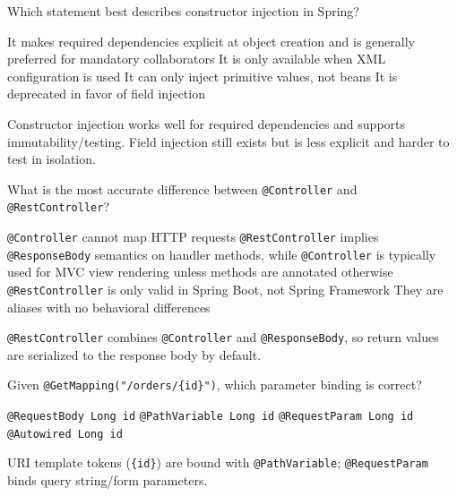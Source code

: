 
\question[4]
Which statement best describes constructor injection in Spring?
\begin{choices}
  \CorrectChoice It makes required dependencies explicit at object creation and is generally preferred for mandatory collaborators
  \choice It is only available when XML configuration is used
  \choice It can only inject primitive values, not beans
  \choice It is deprecated in favor of field injection
\end{choices}
\begin{solution}
  Constructor injection works well for required dependencies and supports immutability/testing. Field injection still exists but is less explicit and harder to test in isolation.
\end{solution}

\question[4]
What is the most accurate difference between \texttt{@Controller} and \texttt{@RestController}?
\begin{choices}
  \choice \texttt{@Controller} cannot map HTTP requests
  \CorrectChoice \texttt{@RestController} implies \texttt{@ResponseBody} semantics on handler methods, while \texttt{@Controller} is typically used for MVC view rendering unless methods are annotated otherwise
  \choice \texttt{@RestController} is only valid in Spring Boot, not Spring Framework
  \choice They are aliases with no behavioral differences
\end{choices}
\begin{solution}
  \texttt{@RestController} combines \texttt{@Controller} and \texttt{@ResponseBody}, so return values are serialized to the response body by default.
\end{solution}

\question[4]
Given \texttt{@GetMapping("/orders/\{id\}")}, which parameter binding is correct?
\begin{choices}
  \choice \texttt{@RequestBody Long id}
  \CorrectChoice \texttt{@PathVariable Long id}
  \choice \texttt{@RequestParam Long id}
  \choice \texttt{@Autowired Long id}
\end{choices}
\begin{solution}
  URI template tokens (\texttt{\{id\}}) are bound with \texttt{@PathVariable}; \texttt{@RequestParam} binds query string/form parameters.
\end{solution}

